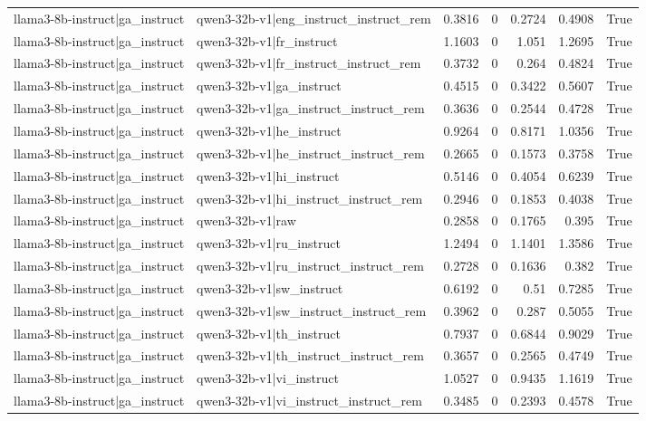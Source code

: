 \begin{table}
\begin{tabular}{l l r r r r l}
llama3-8b-instruct|ga_instruct & qwen3-32b-v1|eng_instruct_instruct_rem & 0.3816 & 0 & 0.2724 & 0.4908 & True \\
llama3-8b-instruct|ga_instruct & qwen3-32b-v1|fr_instruct & 1.1603 & 0 & 1.051 & 1.2695 & True \\
llama3-8b-instruct|ga_instruct & qwen3-32b-v1|fr_instruct_instruct_rem & 0.3732 & 0 & 0.264 & 0.4824 & True \\
llama3-8b-instruct|ga_instruct & qwen3-32b-v1|ga_instruct & 0.4515 & 0 & 0.3422 & 0.5607 & True \\
llama3-8b-instruct|ga_instruct & qwen3-32b-v1|ga_instruct_instruct_rem & 0.3636 & 0 & 0.2544 & 0.4728 & True \\
llama3-8b-instruct|ga_instruct & qwen3-32b-v1|he_instruct & 0.9264 & 0 & 0.8171 & 1.0356 & True \\
llama3-8b-instruct|ga_instruct & qwen3-32b-v1|he_instruct_instruct_rem & 0.2665 & 0 & 0.1573 & 0.3758 & True \\
llama3-8b-instruct|ga_instruct & qwen3-32b-v1|hi_instruct & 0.5146 & 0 & 0.4054 & 0.6239 & True \\
llama3-8b-instruct|ga_instruct & qwen3-32b-v1|hi_instruct_instruct_rem & 0.2946 & 0 & 0.1853 & 0.4038 & True \\
llama3-8b-instruct|ga_instruct & qwen3-32b-v1|raw & 0.2858 & 0 & 0.1765 & 0.395 & True \\
llama3-8b-instruct|ga_instruct & qwen3-32b-v1|ru_instruct & 1.2494 & 0 & 1.1401 & 1.3586 & True \\
llama3-8b-instruct|ga_instruct & qwen3-32b-v1|ru_instruct_instruct_rem & 0.2728 & 0 & 0.1636 & 0.382 & True \\
llama3-8b-instruct|ga_instruct & qwen3-32b-v1|sw_instruct & 0.6192 & 0 & 0.51 & 0.7285 & True \\
llama3-8b-instruct|ga_instruct & qwen3-32b-v1|sw_instruct_instruct_rem & 0.3962 & 0 & 0.287 & 0.5055 & True \\
llama3-8b-instruct|ga_instruct & qwen3-32b-v1|th_instruct & 0.7937 & 0 & 0.6844 & 0.9029 & True \\
llama3-8b-instruct|ga_instruct & qwen3-32b-v1|th_instruct_instruct_rem & 0.3657 & 0 & 0.2565 & 0.4749 & True \\
llama3-8b-instruct|ga_instruct & qwen3-32b-v1|vi_instruct & 1.0527 & 0 & 0.9435 & 1.1619 & True \\
llama3-8b-instruct|ga_instruct & qwen3-32b-v1|vi_instruct_instruct_rem & 0.3485 & 0 & 0.2393 & 0.4578 & True \\

\end{tabular}
\end{table}
